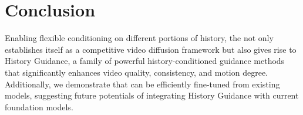 \section{Conclusion}
Enabling flexible conditioning on different portions of history, the \method not only establishes itself as a competitive video diffusion framework but also gives rise to History Guidance, a family of powerful history-conditioned guidance methods that significantly enhances video quality, consistency, and motion degree. Additionally, we demonstrate that \mtd can be efficiently fine-tuned from existing models, suggesting future potentials of integrating History Guidance with current foundation models.



